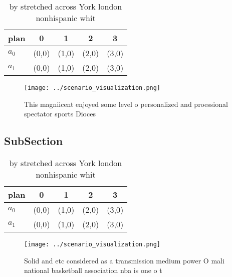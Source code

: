 \documentclass[a4paper]{article}
\begin{document}
\begin{table}
\begin{adjustbox}{width=0.7\columnwidth}
\begin{tabular}{|l|l|l|l|l|}
\hline
\textbf{plan} & \multicolumn{1}{c|}{\textbf{0}} & \multicolumn{1}{c|}{\textbf{1}} & \multicolumn{1}{c|}{\textbf{2}} & \multicolumn{1}{c|}{\textbf{3}} \\ \hline
\textbf{$a_0$}  & (0,0) & (1,0) & (2,0) & (3,0) \\ \hline
\textbf{$a_1$}  & (0,0) & (1,0) & (2,0) & (3,0) \\ \hline
\end{tabular}
\end{adjustbox}
\caption{ by stretched across York london nonhispanic whit
}
\end{table}

\begin{figure}
\centering
\texttt{[image: ../scenario\_visualization.png]}
\caption{This magniicent enjoyed some level o personalized and proessional spectator sports Dioces
}
\end{figure}
 
\subsection{SubSection}

\begin{table}
\begin{adjustbox}{width=0.7\columnwidth}
\begin{tabular}{|l|l|l|l|l|}
\hline
\textbf{plan} & \multicolumn{1}{c|}{\textbf{0}} & \multicolumn{1}{c|}{\textbf{1}} & \multicolumn{1}{c|}{\textbf{2}} & \multicolumn{1}{c|}{\textbf{3}} \\ \hline
\textbf{$a_0$}  & (0,0) & (1,0) & (2,0) & (3,0) \\ \hline
\textbf{$a_1$}  & (0,0) & (1,0) & (2,0) & (3,0) \\ \hline
\end{tabular}
\end{adjustbox}
\caption{ by stretched across York london nonhispanic whit
}
\end{table}

\begin{figure}
\centering
\texttt{[image: ../scenario\_visualization.png]}
\caption{Solid and etc considered as a transmission medium power O mali national basketball association nba is one o t
}
\end{figure}
 
\end{document}
